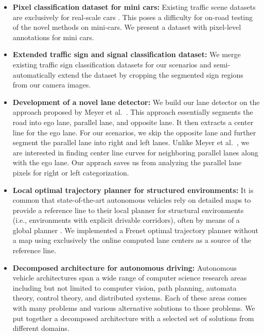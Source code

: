 \begin{itemize}
  \item \textbf{Pixel classification dataset for mini cars:} Existing traffic
    scene datasets are exclusively for real-scale cars \cite{Huang2018TheAD,
    Cordts2016TheCD, Geiger2012AreWR, Neuhold2017TheMV}. This poses a
    difficulty for on-road testing of the novel methods on mini-cars. We
    present a dataset with pixel-level annotations for mini cars.
  \item \textbf{Extended traffic sign and signal classification dataset:} We
    merge existing traffic sign classification datasets
    \cite{Timofte2009MultiviewTS, Stallkamp2012ManVC, Shakhuro2016RussianTS,
    Serna2018ClassificationOT, MaldonadoBascn2007RoadSignDA} for our scenarios
    and semi-automatically extend the dataset by cropping the segmented sign
    regions from our camera images.
  \item \textbf{Development of a novel lane detector:} We build our lane
    detector on the approach proposed by Meyer et al.\ \cite{Meyer2018DeepSL}.
    This approach essentially segments the road into ego lane, parallel lane,
    and opposite lane. It then extracts a center line for the ego lane. For our
    scenarios, we skip the opposite lane and further segment the parallel lane
    into right and left lanes. Unlike Meyer et al.\ \cite{Meyer2018DeepSL}, we
    are interested in finding center line curves for neighboring parallel lanes
    along with the ego lane. Our apprach saves us from analyzing the parallel
    lane pixels for right or left categorization.
  \item \textbf{Local optimal trajectory planner for structured environments:}
    It is common that state-of-the-art autonomous vehicles rely on detailed
    maps to provide a reference line to their local planner for structural
    environments (i.e., environments with explicit drivable corridors), often
    by means of a global planner \cite{Thrun2006StanleyTR,
    Montemerlo2009JuniorTS, Kato2018AutowareOB}. We implemented a Frenet
    optimal trajectory planner \cite{Werling2010OptimalTG} without a map using
    exclusively the online computed lane centers as a source of the reference
    line.
  \item \textbf{Decomposed architecture for autonomous driving:} Autonomous
    vehicle architectures span a wide range of computer science research areas
    including but not limited to computer vision, path planning, automata
    theory, control theory, and distributed systems. Each of these areas comes
    with many problems and various alternative solutions to those problems. We
    put together a decomposed architecture with a selected set of solutions
    from different domains.
\end{itemize}

